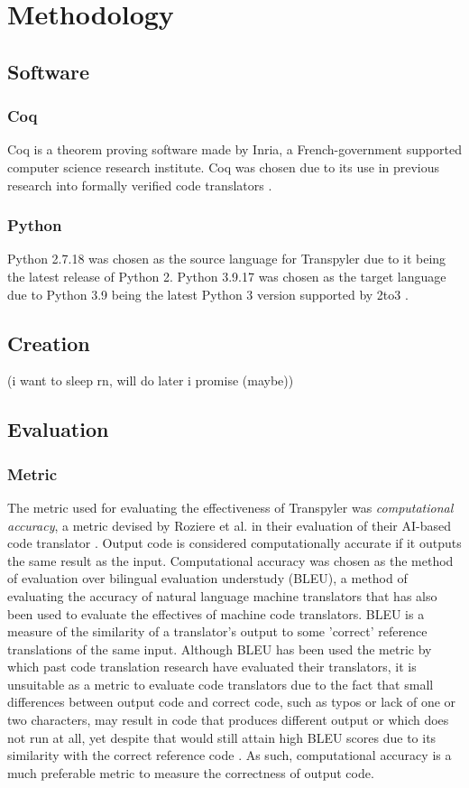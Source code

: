 \section{Methodology}
\subsection{Software}
\subsubsection{Coq}
Coq is a theorem proving software made by Inria, a French-government supported computer science research institute. Coq was chosen due to its use in previous research into formally verified code translators \autocite{Roziere}\autocite{Zhao}.
\subsubsection{Python}
Python 2.7.18 was chosen as the source language for Transpyler due to it being the latest release of Python 2. Python 3.9.17 was chosen as the target language due to Python 3.9 being the latest Python 3 version supported by 2to3 \autocite{2to3}.
\subsection{Creation}
(i want to sleep rn, will do later i promise (maybe))
\subsection{Evaluation}
\subsubsection{Metric}
The metric used for evaluating the effectiveness of Transpyler was \textit{computational accuracy}, a metric devised by Roziere et al. in their evaluation of their AI-based code translator \autocite{Roziere}. Output code is considered computationally accurate if it outputs the same result as the input. Computational accuracy was chosen as the method of evaluation over bilingual evaluation understudy (BLEU), a method of evaluating the accuracy of natural language machine translators that has also been used to evaluate the effectives of machine code translators. BLEU is a measure of the similarity of a translator's output to some 'correct' reference translations of the same input. Although BLEU has been used the metric by which past code translation research have evaluated their translators, it is unsuitable as a metric to evaluate code translators due to the fact that small differences between output code and correct code, such as typos or lack of one or two characters, may result in code that produces different output or which does not run at all, yet despite that would still attain high BLEU scores due to its similarity with the correct reference code \autocite{Roziere}. As such, computational accuracy is a much preferable metric to measure the correctness of output code.
